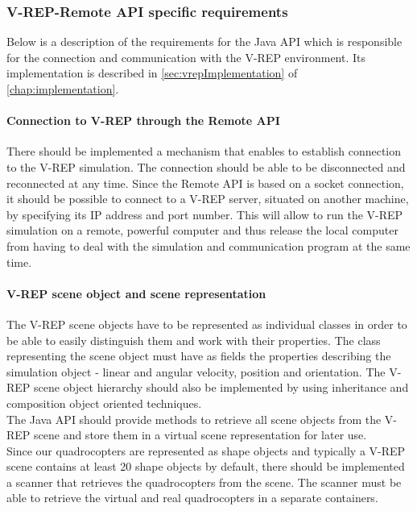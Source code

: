 \subsubsection{V-REP-Remote API specific requirements}
\label{sec:requirementsVREP}

Below is a description of the requirements for the Java API which is responsible for the connection and communication with the V-REP environment. Its implementation is described in \ref{sec:vrepImplementation} of \ref{chap:implementation}.

\paragraph{Connection to V-REP through the Remote API}

There should be implemented a mechanism that enables to establish connection to the V-REP simulation. The connection should be able to be disconnected and reconnected at any time. Since the Remote API is based on a socket connection, it should be possible to connect to a V-REP server, situated on another machine, by specifying its IP address and port number. This will allow to run the V-REP simulation on a remote, powerful computer and thus release the local computer from having to deal with the simulation and communication program at the same time.

\paragraph{V-REP scene object and scene representation}\label{sceneobject}
The V-REP scene objects have to be represented as individual classes in order to be able to easily distinguish them and work with their properties. The class representing the scene object must have as fields the properties describing the simulation object - linear and angular velocity, position and orientation. The V-REP scene object hierarchy should also be implemented by using inheritance and composition object oriented techniques. \\
The Java API should provide methods to retrieve all scene objects from the V-REP scene and store them in a virtual scene representation for later use.\\
Since our quadrocopters are represented as shape objects and typically a V-REP scene contains at least 20 shape objects by default, there should be implemented a scanner that retrieves the quadrocopters from the scene. The scanner must be able to retrieve the virtual and real quadrocopters in a separate containers.

